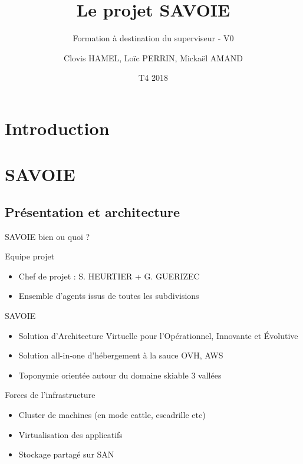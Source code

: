 \documentclass[10pt]{beamer}
\title{Le projet SAVOIE}
\subtitle{Formation à destination du superviseur - V0}
\author{Clovis HAMEL, Loïc PERRIN, Mickaël AMAND}
\date{T4 2018}
\begin{document}
\begin{frame}
  \titlepage
\end{frame}

\begin{frame}{}
  \tableofcontents
\end{frame}

\section{Introduction}


\section{SAVOIE}
\subsection{Présentation et architecture}

\begin{frame}{SAVOIE bien ou quoi ?}
\begin{block}{Equipe projet}
\begin{itemize}
\item Chef de projet : S. HEURTIER + G. GUERIZEC 
\item Ensemble d'agents issus de toutes les subdivisions
\end{itemize}
\end{block}
\begin{block}{SAVOIE}
\begin{itemize}
\item Solution d’Architecture Virtuelle pour l’Opérationnel, Innovante et Évolutive  
\item Solution all-in-one d'hébergement à la sauce OVH, AWS  
\item Toponymie orientée autour du domaine skiable 3 vallées  
\end{itemize}
\end{block}
\begin{block}{Forces de l'infrastructure}
\begin{itemize}
\item Cluster de machines (en mode cattle, escadrille etc) \pause
\item Virtualisation des applicatifs \pause
\item Stockage partagé sur SAN  
\end{itemize}
\end{block}
\end{frame}
\end{document}
